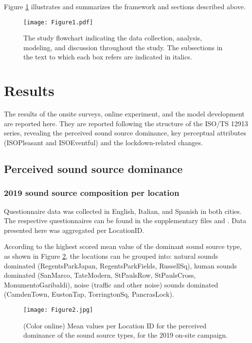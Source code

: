 Figure \ref{fig:framework} illustrates and summarizes the framework and sections described above. 

\begin{figure}[ht]
    \centering
    \texttt{[image: Figure1.pdf]}
    \caption{The study flowchart indicating the data collection, analysis, modeling, and discussion throughout the study. The subsections in the text to which each box refers are indicated in italics.}
    \label{fig:framework}
\end{figure}

\section{Results}

The results of the onsite surveys, online experiment, and the model development are reported here. They are reported following the structure of the ISO/TS 12913 series, revealing the perceived sound source dominance, key perceptual attributes (ISOPleasant and ISOEventful) and the lockdown-related changes.

\subsection{Perceived sound source dominance}

\subsubsection{2019 sound source composition per location}

Questionnaire data was collected in English, Italian, and Spanish in both cities. The respective questionnaires can be found in the supplementary files and \citet{mitchell_soundscape_2020}. Data presented here was aggregated per LocationID.

According to the highest scored mean value of the dominant sound source type, as shown in Figure \ref{fig:barchart}, the locations can be grouped into: natural sounds dominated (RegentsParkJapan, RegentsParkFields, RussellSq), human sounds dominated (SanMarco, TateModern, StPaulsRow, StPaulsCross, MonumentoGaribaldi), noise (traffic and other noise) sounds dominated (CamdenTown, EustonTap, TorringtonSq, PancrasLock).

\begin{figure}[h]
    \centering
    \texttt{[image: Figure2.jpg]}
    \caption{(Color online) Mean values per Location ID for the perceived dominance of the sound source types, for the 2019 on-site campaign.}
    \label{fig:barchart}
\end{figure}

